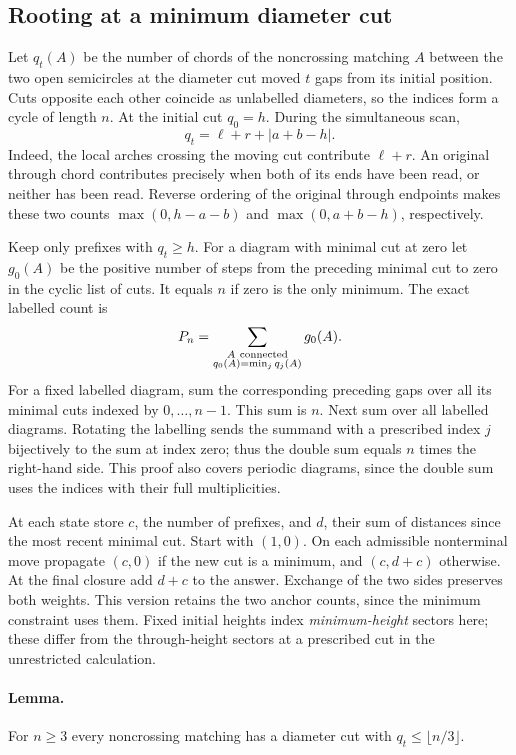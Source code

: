 \subsection{Rooting at a minimum diameter cut}
\label{sec:minimum-cut}

Let \(q_t(A)\) be the number of chords of the noncrossing matching \(A\)
between the two open semicircles at the diameter cut moved \(t\) gaps from
its initial position. Cuts opposite each other coincide as unlabelled
diameters, so the indices form a cycle of length \(n\). At the initial
cut \(q_0=h\). During the simultaneous scan,
\[
 q_t=\ell+r+|a+b-h|.
\]
Indeed, the local arches crossing the moving cut contribute \(\ell+r\).
An original through chord contributes precisely when both of its ends have
been read, or neither has been read. Reverse ordering of the original
through endpoints makes these two counts \(\max(0,h-a-b)\) and
\(\max(0,a+b-h)\), respectively.

Keep only prefixes with \(q_t\ge h\). For a diagram with minimal cut at
zero let \(g_0(A)\) be the positive number of steps from the preceding
minimal cut to zero in the cyclic list of cuts. It equals \(n\) if zero is
the only minimum. The exact labelled count is
\[
 P_n=\sum_{\substack{A\ {\rm connected}\\q_0(A)=\min_jq_j(A)}}g_0(A).
\]
For a fixed labelled diagram, sum the corresponding preceding gaps over
all its minimal cuts indexed by \(0,\dots,n-1\). This sum is \(n\).
Next sum over all labelled diagrams. Rotating the labelling sends the
summand with a prescribed index \(j\) bijectively to the sum at index zero;
thus the double sum equals \(n\) times the right-hand side. This proof also
covers periodic diagrams, since the double sum uses the indices with their
full multiplicities.

At each state store \(c\), the number of prefixes, and \(d\), their sum of
distances since the most recent minimal cut. Start with \((1,0)\). On each
admissible nonterminal move propagate \((c,0)\) if the new cut is a minimum,
and \((c,d+c)\) otherwise. At the final closure add \(d+c\) to the answer.
Exchange of the two sides preserves both weights. This version retains the
two anchor counts, since the minimum constraint uses them. Fixed initial
heights index \emph{minimum-height} sectors here; these differ from the
through-height sectors at a prescribed cut in the unrestricted calculation.

\paragraph{Lemma.}
For \(n\ge3\) every noncrossing matching has a diameter cut with
\(q_t\le\lfloor n/3\rfloor\).

